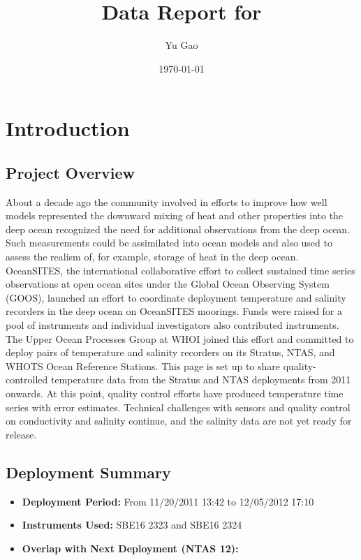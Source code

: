 \documentclass[11pt]{article}
\title{Data Report for \projectname{} \casenumber{}}
\author{Yu Gao}
\date{\today}
\newcommand{\projectname}{NTAS}  %
\newcommand{\nextcasenumber}{12}  %
\newcommand{\FirstInstrumentType}{SBE16}  %
\newcommand{\SecondInstrumentType}{SBE16}  %
\newcommand{\DeploymentSpike}{11/20/2011 13:42} %
\newcommand{\RecoverySpike}{12/05/2012 17:10} %
\newcommand{\FirstInstrument}{2323}
\newcommand{\SecondInstrument}{2324}
\begin{document}
\maketitle
\tableofcontents
\newpage

\section{Introduction}

\subsection{Project Overview}

About a decade ago the community involved in  efforts to improve how well models
represented the downward mixing of heat and other properties into the deep ocean
recognized the need for additional observations from the deep ocean.  Such measurements
could be assimilated into ocean models and also used to assess the realism of, for example,
storage of heat in the deep ocean.  OceanSITES, the international collaborative effort to collect sustained time series observations at open ocean sites under the Global Ocean Observing System
(GOOS), launched an effort to coordinate deployment temperature and salinity
recorders in the deep ocean on OceanSITES moorings. Funds were raised for a pool of
instruments and individual investigators also contributed instruments. The Upper Ocean
Processes Group at WHOI joined this effort and committed to deploy pairs of temperature and salinity recorders on its Stratus, NTAS, and WHOTS Ocean Reference Stations.  This page is set
up to share quality-controlled temperature data from the Stratus and NTAS deployments from
2011 onwards.  At this point, quality control efforts have produced temperature time series with
error estimates.  Technical challenges with sensors and quality control on conductivity and salinity continue, and the salinity data are not yet ready for release.

\subsection{Deployment Summary}
\begin{itemize}
    \item \textbf{Deployment Period:} From \DeploymentSpike{} to \RecoverySpike{}
    \item \textbf{Instruments Used:} \FirstInstrumentType{} \FirstInstrument{} and \SecondInstrumentType{} \SecondInstrument{}
    \item \textbf{Overlap with Next Deployment (\projectname{} \nextcasenumber{}):} \HasNextDeploymentOverlap{}
\end{itemize}
\end{document}
